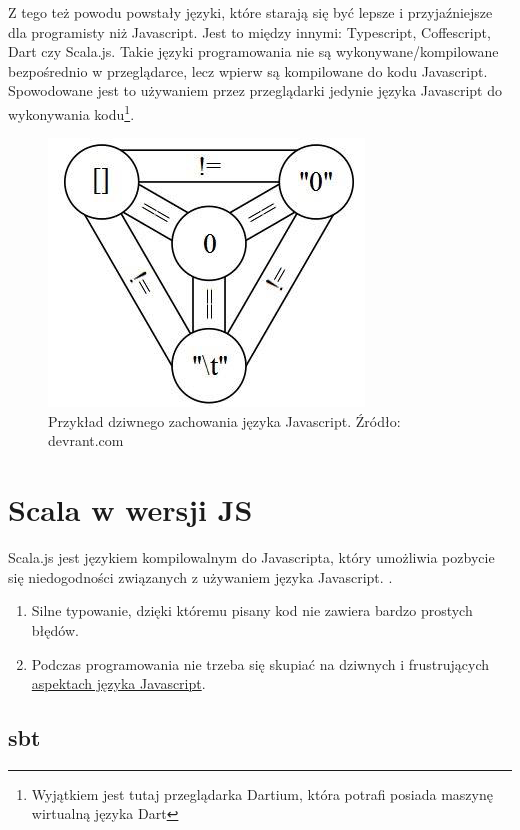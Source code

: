 Z tego też powodu powstały języki, które starają się być lepsze i przyjaźniejsze dla programisty niż Javascript. Jest to między innymi: Typescript, Coffescript, Dart czy Scala.js. Takie języki programowania nie są wykonywane/kompilowane bezpośrednio w przeglądarce, lecz wpierw są kompilowane do kodu Javascript. Spowodowane jest to używaniem przez przeglądarki jedynie języka Javascript do wykonywania kodu\footnote{Wyjątkiem jest tutaj przeglądarka Dartium, która potrafi posiada maszynę wirtualną języka Dart\cite{Dartium}}. 

\begin{figure}[h]
	\centering
	\includegraphics{images/javagod.png}
	 \caption{Przykład dziwnego zachowania języka Javascript. Źródło: devrant.com}
\end{figure}

\section{Scala w wersji JS}

Scala.js jest językiem kompilowalnym do Javascripta, który umożliwia pozbycie się niedogodności związanych z używaniem języka Javascript. \cite{ScalaJS}. 



\begin{enumerate}
	\item Silne typowanie, dzięki któremu pisany kod nie zawiera bardzo prostych błędów.
	\item Podczas programowania nie trzeba się skupiać na dziwnych i frustrujących \hyperref[lst:javascriptSUCKS]{aspektach języka Javascript}.
\end{enumerate}


\subsection{sbt}
	

